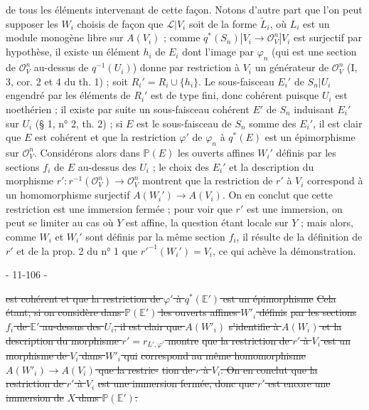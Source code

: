 de tous les éléments intervenant de cette façon. Notons d'autre part que l'on peut supposer les $W_i$ choisis de façon que $\mathcal{L}|V_i$ soit de la forme $\tilde{L}_i$, où $L_i$ est un module monogène libre sur $A(V_i)$ ; comme $q^*(S_n)|V_i \to \mathcal{O}_V^n|V_i$ est surjectif par hypothèse, il existe un élément $h_i$ de $E_i$ dont l'image par $\varphi_n$ (qui est une section de $\mathcal{O}_V^n$ au-dessus de $q^{-1}(U_i)$) donne par restriction à $V_i$ un générateur de $\mathcal{O}_V^n$ (I, 3, cor. 2 et 4 du th. 1) ; soit $R_i' = R_i \cup \{h_i\}$. Le sous-faisceau $E_i'$ de $S_n|U_i$ engendré par les éléments de $R_i'$ est de type fini, donc cohérent puisque $U_i$ est noethérien ; il existe par suite un sous-faisceau cohérent $E'$ de $S_n$ induisant $E_i'$ sur $U_i$ (§ 1, n° 2, th. 2) ; si $E$ est le sous-faisceau de $S_n$ somme des $E_i'$, il est clair que $E$ est cohérent et que la restriction $\varphi'$ de $\varphi_n$ à $q^*(E)$ est un épimorphisme sur $\mathcal{O}_V^n$. Considérons alors dans $\mathbb{P}(E)$ les ouverts affines $W_i'$ définis par les sections $f_i$ de $E$ au-dessus des $U_i$ ; le choix des $E_i'$ et la description du morphisme $r' : r^{-1}(\mathcal{O}_V^n) \to \mathcal{O}_V^n$ montrent que la restriction de $r'$ à $V_i$ correspond à un homomorphisme surjectif $A(W_i') \to A(V_i)$. On en conclut que cette restriction est une immersion fermée ; pour voir que $r'$ est une immersion, on peut se limiter au cas où $Y$ est affine, la question étant locale sur $Y$ ; mais alors, comme $W_i$ et $W_i'$ sont définis par la même section $f_i$, il résulte de la définition de $r'$ et de la prop. 2 du n° 1 que $r'^{-1}(W_i') = V_i$, ce qui achève la démonstration.

\newpage


- 11-106 -

\sout{est cohérent et que la restriction de $\varphi'$ à $q^*(\mathbb{E}')$ est un épimorphisme}
\sout{Cela étant, si on considère dans $\mathbb{P}(\mathbb{E}')$ les ouverts affines $W'_i$ définis}
\sout{par les sections $f_i$ de $\mathbb{E}'$ au-dessus des $U_i$, il est clair que $A(W'_i)$}
\sout{s'identifie à $A(W_i)$ et la description du morphisme $r' = r_{L', \varphi'}$ montre}
\sout{que la restriction de $r'$ à $V_i$ est un morphisme de $V_i$ dans $W'_i$ qui}
\sout{correspond au même homomorphisme $A(W'_i) \to A(V_i)$ que la restric-}
\sout{tion de $r$ à $V_i$. On en conclut que la restriction de $r'$ à $V_i$}
\sout{est une immersion fermée, donc que $r'$ est encore une immersion de}
\sout{$X$ dans $\mathbb{P}(\mathbb{E}')$.}

